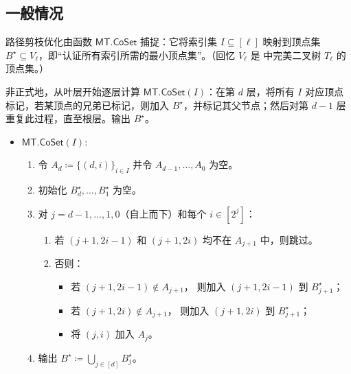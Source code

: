 \documentclass[american,singlepageview]{snargs-book-zh}
\newcommand{\DefineEqual}{\coloneqq}
\newcommand{\CMMessageLength}{\ell}
\newcommand{\MTGraph}{T}
\newcommand{\MTVertexSet}{V}
\newcommand{\MTDepth}{d}
\newcommand{\MTLayer}{j}
\newcommand{\MTSymbol}{\mathsf{MT}}
\newcommand{\MTMessageLength}{\CMMessageLength}
\newcommand{\MTMessageIndex}{i}
\newcommand{\MTMessageIndexSet}{I}
\newcommand{\MTDeriveVertexSet}{\MTSymbol.\mathsf{CoSet}}
\newcommand{\MTPathVertexSet}{A}
\newcommand{\MTCoPathVarVertexSet}{B^{\star}}
\begin{document}
\subsection{一般情况}
\label{section:path-pruning-general}

路径剪枝优化由函数
\(\MTDeriveVertexSet\) 捕捉：它将索引集 \(\MTMessageIndexSet\subseteq[\MTMessageLength]\) 映射到顶点集
\(\MTCoPathVarVertexSet\subseteq\MTVertexSet_{\MTMessageLength}\)，即“认证所有索引所需的最小顶点集”。（回忆 \(\MTVertexSet_{\MTMessageLength}\) 是  中完美二叉树 \(\MTGraph_{\MTMessageLength}\) 的顶点集。）

非正式地，从叶层开始逐层计算 \(\MTDeriveVertexSet(\MTMessageIndexSet)\)：在第 \(\MTDepth\) 层，将所有 \(\MTMessageIndexSet\) 对应顶点标记，若某顶点的兄弟已标记，则加入 \(\MTCoPathVarVertexSet\)，并标记其父节点；然后对第 \(\MTDepth-1\) 层重复此过程，直至根层。输出 \(\MTCoPathVarVertexSet\)。

\begin{itemize}[nolistsep]
\item[] \(\MTDeriveVertexSet(\MTMessageIndexSet)\):
\begin{enumerate}[nolistsep]
  \item 令
  \(\MTPathVertexSet_{\MTDepth}
    \DefineEqual
    \{(\MTDepth,\MTMessageIndex)\}_{\MTMessageIndex\in\MTMessageIndexSet}\)
  并令
  \(\MTPathVertexSet_{\MTDepth-1},\dots,\MTPathVertexSet_{0}\)
  为空。
  \item 初始化
  \(\MTCoPathVarVertexSet_{\MTDepth},\dots,\MTCoPathVarVertexSet_{1}\)
  为空。
  \item 对 \(\MTLayer=\MTDepth-1,\dots,1,0\)（自上而下）和每个
  \(\MTMessageIndex\in[2^{\MTLayer}]\)：
  \begin{enumerate}[nolistsep]
    \item 若 \((\MTLayer+1,2\MTMessageIndex-1)\) 和 \((\MTLayer+1,2\MTMessageIndex)\)
    均不在 \(\MTPathVertexSet_{\MTLayer+1}\) 中，则跳过。
    \item 否则：
      \begin{itemize}[nolistsep]
        \item 若 \((\MTLayer+1,2\MTMessageIndex-1)\notin\MTPathVertexSet_{\MTLayer+1}\)，
          则加入 \((\MTLayer+1,2\MTMessageIndex-1)\) 到
          \(\MTCoPathVarVertexSet_{\MTLayer+1}\)；
        \item 若 \((\MTLayer+1,2\MTMessageIndex)\notin\MTPathVertexSet_{\MTLayer+1}\)，
          则加入 \((\MTLayer+1,2\MTMessageIndex)\) 到
          \(\MTCoPathVarVertexSet_{\MTLayer+1}\)；
        \item 将 \((\MTLayer,\MTMessageIndex)\) 加入 \(\MTPathVertexSet_{\MTLayer}\)。
      \end{itemize}
  \end{enumerate}
  \item 输出
  \(\MTCoPathVarVertexSet\DefineEqual \bigcup_{\MTLayer\in[\MTDepth]} \MTCoPathVarVertexSet_{\MTLayer}\)。
\end{enumerate}
\end{itemize}
\end{document}
